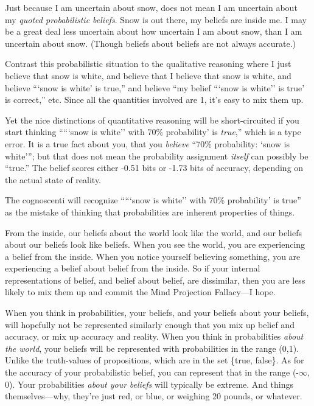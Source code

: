 {
 Just because I am uncertain about snow, does not mean I am
uncertain about my \textit{quoted probabilistic beliefs}. Snow is out
there, my beliefs are inside me. I may be a great deal less uncertain
about how uncertain I am about snow, than I am uncertain about snow.
(Though beliefs about beliefs are not always accurate.)}

{
 Contrast this probabilistic situation to the qualitative reasoning
where I just believe that snow is white, and believe that I believe
that snow is white, and believe ```snow
is white' is true,'' and believe
``my belief ```snow is
white'' is true' is
correct,'' etc. Since all the quantities involved are
1, it's easy to mix them up.}

{
 Yet the nice distinctions of quantitative reasoning will be
short-circuited if you start thinking
`````snow is
white'' with 70\% probability' is
\textit{true},'' which is a type error. It is a true
fact about you, that you \textit{believe} ``70\%
probability: `snow is
white'''; but that does not mean the
probability assignment \textit{itself} can possibly be
``true.'' The belief scores either
-0.51 bits or -1.73 bits of accuracy, depending on the actual state of
reality.}

{
 The cognoscenti will recognize
`````snow is
white'' with 70\% probability' is
true'' as the mistake of thinking that probabilities
are inherent properties of things.}

{
 From the inside, our beliefs about the world look like the world,
and our beliefs about our beliefs look like beliefs. When you see the
world, you are experiencing a belief from the inside. When you notice
yourself believing something, you are experiencing a belief about
belief from the inside. So if your internal representations of belief,
and belief about belief, are dissimilar, then you are less likely to
mix them up and commit the Mind Projection Fallacy---I hope.}

{
 When you think in probabilities, your beliefs, and your beliefs
about your beliefs, will hopefully not be represented similarly enough
that you mix up belief and accuracy, or mix up accuracy and reality.
When you think in probabilities \textit{about the world}, your beliefs
will be represented with probabilities in the range (0,1). Unlike the
truth-values of propositions, which are in the set
\{true,
false\}. As for the accuracy of your
probabilistic belief, you can represent that in the range (-${\infty}$,
0). Your probabilities \textit{about your} \textit{beliefs} will
typically be extreme. And things themselves---why,
they're just red, or blue, or weighing 20 pounds, or
whatever.}

